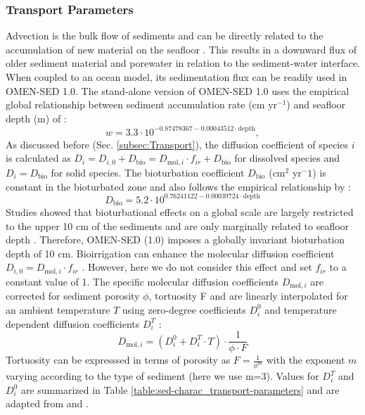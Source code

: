 \documentclass[gmd, manuscript]{copernicus}
\begin{document}
\subsubsection{Transport Parameters}
Advection is the bulk flow of sediments and can be directly related to the accumulation of new material on the seafloor \citep[i.e. sedimentation,][]{burdige2006geochemistry}. 
This results in a downward flux of older sediment material and porewater in relation to the sediment-water interface. When coupled to an ocean model, its sedimentation flux can be readily used in OMEN-SED 1.0. 
The stand-alone version of OMEN-SED 1.0 uses the empirical global relationship between 
sediment accumulation rate (cm yr$^{-1}$) and seafloor depth (m) of \citet{middelburg_empirical_1997}: 
\begin{equation}
 w = 3.3\cdot 10^{-0.87478367-0.00043512\cdot \text{depth}}\label{eq:sedimentation_rate},
\end{equation}
As discussed before (Sec. \ref{subsec:Transport}), the diffusion coefficient of species $i$ is calculated as $D_i=D_{i,0}+D_{\mathrm{bio}}=D_{\mathrm{mol},i}\cdot f_{ir}+D_{\mathrm{bio}}$ for dissolved species and $D_i=D_{\mathrm{bio}}$ for solid species. 
The bioturbation coefficient $D_{\mathrm{bio}}$ (cm$^2$ yr$^-1$) is constant in the bioturbated zone and also follows the empirical relationship by \citet{middelburg_empirical_1997}:
\begin{equation}
 D_{\mathrm{bio}} = 5.2\cdot 10^{0.76241122-0.00039724\cdot \text{depth}}\label{eq:bioturbation_coeff}
\end{equation}
Studies showed that bioturbational effects on a global scale are largely restricted to the upper 10 cm of the sediments and are only marginally related to seafloor depth \citep[e.g.][]{boudreau_mean_1998, teal_global_2010}. 
Therefore, OMEN-SED (1.0) imposes a globally invariant bioturbation depth of 10 cm. 
Bioirrigation can enhance the molecular diffusion coefficient $D_{i,0}=D_{\mathrm{mol},i}\cdot f_{ir}$ \citep{soetaert1996dynamic}. However, here we do not consider this effect 
and set $f_{ir}$ to a constant value of 1. The specific molecular diffusion coefficients $D_{\mathrm{mol},i}$ are corrected for sediment porosity $\phi$, tortuosity F and are linearly interpolated for an ambient temperature $T$ using zero-degree 
coefficients $D^0_i$ and temperature dependent diffusion coefficients $D^T_i$ \citep[compare ][]{gypens_simple_2008}:
\begin{equation*}
 D_{\mathrm{mol},i} = (D^0_i + D^T_i \cdot T )\cdot \frac{1}{\phi\cdot F}
\end{equation*}
Tortuosity can be expresssed in terms of porosity as $F = \frac{1}{\phi^m}$ \citep{ullman_diffusion_1982} with the exponent $m$ varying according to the type of sediment (here we use m=3). 
Values for $D^T_i$ and $D^0_i$ are summarized in Table \ref{table:sed-charac_transport-parameters} and are adapted from \citet{Li_diffusion_1974} and \citet{gypens_simple_2008}.
\end{document}
